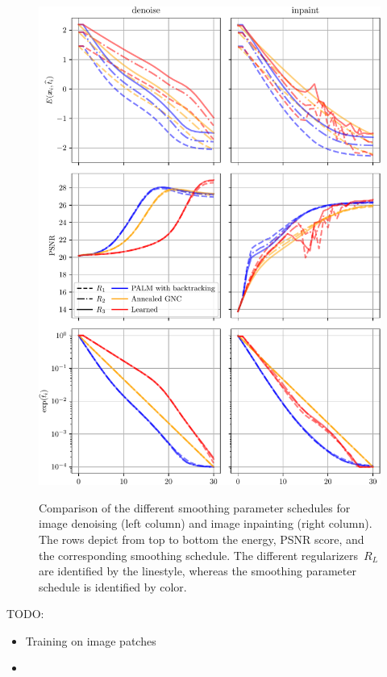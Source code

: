\documentclass[nohyperref]{article}
\theoremstyle{plain}
\theoremstyle{definition}
\theoremstyle{remark}
\begin{document}
\begin{figure}[t]
\includegraphics[width=\linewidth]{./figures/results/plots_denoise_inpaint}
\label{fig:plotsDenoiseInpaint}
\caption{Comparison of the different smoothing parameter schedules for image denoising (left column) and image inpainting (right column).
The rows depict from top to bottom the energy, PSNR score, and the corresponding smoothing schedule.
The different regularizers~$R_L$ are identified by the linestyle, whereas the smoothing parameter schedule is identified by color.
}
\end{figure}

TODO:
\begin{itemize}
    \item Training on image patches
    \item 
\end{itemize}

\end{document}
